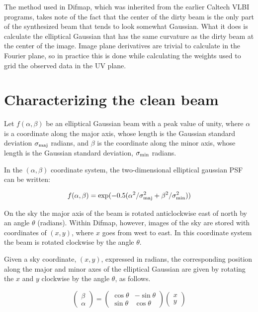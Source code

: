 \documentclass[11pt]{article}
\newcommand{\bpa}{\theta}
\newcommand{\minor}{\sigma_{\mbox{\scriptsize min}}}
\newcommand{\major}{\sigma_{\mbox{\scriptsize maj}}}
\begin{document}
The method used in Difmap, which was inherited from the earlier
Caltech VLBI programs, takes note of the fact that the center of the
dirty beam is the only part of the synthesized beam that tends to look
somewhat Gaussian. What it does is calculate the elliptical Gaussian
that has the same curvature as the dirty beam at the center of the
image. Image plane derivatives are trivial to calculate in the Fourier
plane, so in practice this is done while calculating the weights used
to grid the observed data in the UV plane.

\section{Characterizing the clean beam}

Let $f(\alpha,\beta)$ be an elliptical Gaussian beam with a peak value
of unity, where $\alpha$ is a coordinate along the major axis, whose
length is the Gaussian standard deviation $\major$ radians, and
$\beta$ is the coordinate along the minor axis, whose length is the
Gaussian standard deviation, $\minor$ radians.

In the $(\alpha,\beta)$ coordinate system, the two-dimensional
elliptical gaussian PSF can be written:

\begin{equation}
\label{gaussian_eqn}
  f(\alpha,\beta) = \exp(-0.5 (\alpha^2 / \major^2 + \beta^2 / \minor^2))
\end{equation}

On the sky the major axis of the beam is rotated anticlockwise east of
north by an angle $\bpa$ (radians). Within Difmap, however, images of
the sky are stored with coordinates of $(x,y)$, where $x$ goes from
west to east. In this coordinate system the beam is rotated clockwise
by the angle $\bpa$.

Given a sky coordinate, $(x,y)$, expressed in radians, the
corresponding position along the major and minor axes of the
elliptical Gaussian are given by rotating the $x$ and $y$ clockwise by
the angle $\bpa$, as follows.

\begin{equation}
\begin{pmatrix}
\beta \\
\alpha
\end{pmatrix}
=
\begin{pmatrix}
    \cos{\bpa} & -\sin{\bpa}\\
    \sin{\bpa} &  \cos{\bpa}
\end{pmatrix}
\begin{pmatrix}
x \\
y
\end{pmatrix}
\end{equation}
\end{document}

